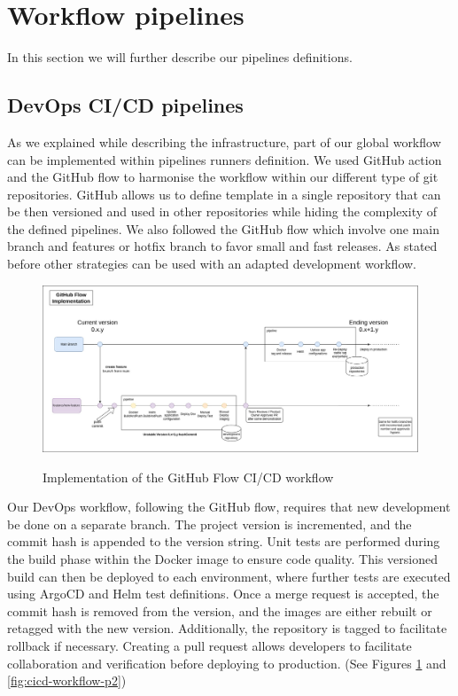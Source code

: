 \section{Workflow pipelines}\label{sec:workflow}

In this section we will further describe our pipelines definitions.

\subsection{DevOps CI/CD pipelines}\label{subsec:ci/cd-pipelines-and-development-workflow}
As we explained while describing the infrastructure, part of our global workflow can be implemented within pipelines runners definition.
We used GitHub action and the GitHub flow to harmonise the workflow within our different type of git repositories.
GitHub allows us to define template in a single repository that can be then versioned and used in other repositories while hiding the complexity of the defined pipelines.
We also followed the GitHub flow which involve one main branch and features or hotfix branch to favor small and fast releases.
As stated before other strategies can be used with an adapted development workflow.

\begin{figure}[!htbp]
    \centering
    \caption{Implementation of the GitHub Flow CI/CD workflow}
    \includegraphics[scale=0.3]{images/project/cicd-workflow-p1}
    \label{fig:cicd-workflow-p1}
\end{figure}

Our DevOps workflow, following the GitHub flow, requires that new development be done on a separate branch.
The project version is incremented, and the commit hash is appended to the version string.
Unit tests are performed during the build phase within the Docker image to ensure code quality.
This versioned build can then be deployed to each environment, where further tests are executed using ArgoCD and Helm test definitions.
Once a merge request is accepted, the commit hash is removed from the version, and the images are either rebuilt or retagged with the new version.
Additionally, the repository is tagged to facilitate rollback if necessary.
Creating a pull request allows developers to facilitate collaboration and verification before deploying to production.
(See Figures \ref{fig:cicd-workflow-p1} and \ref{fig:cicd-workflow-p2})

